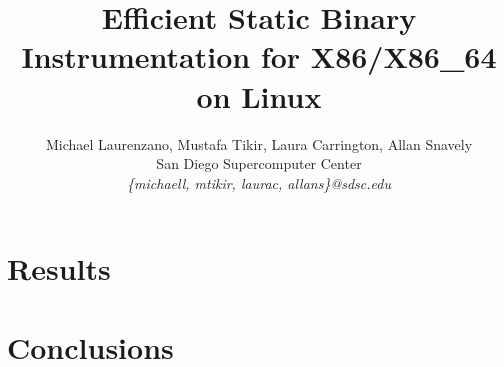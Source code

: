 \documentclass[a4paper,11pt,leqno,notitlepage,onecolumn]{article}
\begin{document}
\title{Efficient Static Binary Instrumentation for X86/X86\_64 on Linux}
\author{Michael Laurenzano, Mustafa Tikir, Laura Carrington, Allan Snavely\\
San Diego Supercomputer Center\\
\it{\{michaell, mtikir, laurac, allans\}@sdsc.edu}}
\date{}
\maketitle

\begin{abstract}

\end{abstract}

\label{Section:Introduction}


\label{Section:Overview}


\label{Section:Efficiency}


\label{Section:Results}
\section{Results}
%

\label{Section:Future}


\label{Section:Conclusions}
\section{Conclusions}
%



\end{document}
